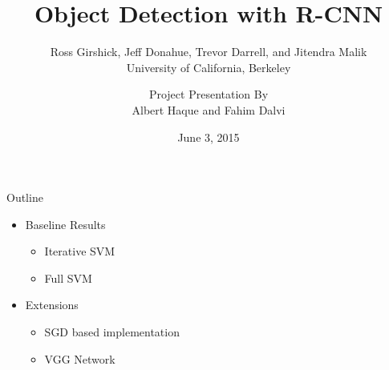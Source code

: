 \documentclass[compress,aspectratio=43]{beamer}
\title[Stanford University]{Object Detection with R-CNN}
\subtitle{\scriptsize \vspace{3mm}Ross Girshick, Jeff Donahue, Trevor Darrell, and Jitendra Malik\\University of California, Berkeley\vspace{-3mm}}
\author[\enspace\,\,\, Albert Haque, Fahim Dalvi]{
{\scriptsize Project Presentation By}\\
Albert Haque and Fahim Dalvi
}
\institute[Stanford University]{}
\date{June 3, 2015}
\begin{document}
\section{}%
\begin{frame}
\titlepage
\end{frame}

\begin{frame}{Outline}
\begin{itemize}
\item{Baseline Results}
    \begin{itemize}
        \item Iterative SVM
        \item Full SVM
    \end{itemize} 
    \item{Extensions}
    \begin{itemize}
        \item SGD based implementation
        \item VGG Network
    \end{itemize}
\end{itemize}
\end{frame}
\end{document}
